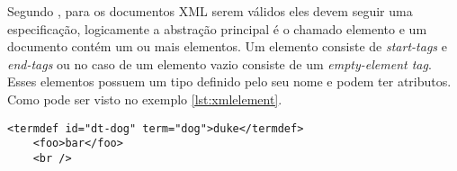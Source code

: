 Segundo , para os documentos XML serem válidos eles devem seguir uma especificação, 
logicamente a abstração principal é o chamado elemento e um documento contém um ou mais elementos. 
Um elemento consiste de \textit{start-tags} e \textit{end-tags} ou no caso de um elemento vazio 
consiste de um \textit{empty-element tag}. Esses elementos possuem um tipo definido pelo seu nome e 
podem ter atributos. Como pode ser visto no exemplo \ref{lst:xmlelement}.

\begin{lstlisting}[caption=Exemplo de elementos XML,label={lst:xmlelement}]
    <termdef id="dt-dog" term="dog">duke</termdef>
    <foo>bar</foo>
    <br />
\end{lstlisting}
